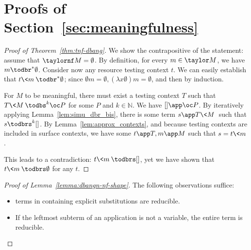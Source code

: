 \section{Proofs of Section~\ref{sec:meaningfulness}}
\label{appendix:meaningfulness}

\begin{proof}[Proof of Theorem~\ref{thm:tnf-dbang}]
	We show the contrapositive of the statement: assume that $\taylornf
	M=\emptyset$. By definition, for every $m\in\taylor M$, we have $m\todbr^*
	\emptyset$. Consider now any resource testing context $t$. We can easily
	establish that $t\<m\>\todbr^* \emptyset $; since $\emptyset m=\emptyset,
	(\lambda x \emptyset)m=\emptyset$, and then by induction.

	For $M$ to be meaningful, there must exist a testing context $T$ such that
	$T\<M\>\todbs^k \oc P$ for some $P$ and $k\in\mathbb N$. We have
	$[]\app \oc P$. By iteratively applying 
	Lemma~\ref{lem:simu_dbr_bis}, there is some term $s\app T\<M\>$ such
	that $s\todbrs^k []$. By Lemma~\ref{lem:approx_contexts}, and because
	testing contexts are included in surface contexts, we have some $t\app
	T, m\app M$ such that $s=t\<m\>$.

	This leads to a contradiction: $t\<m\>\todbrs []$, yet we have shown
	that $t\<m\>\todbrs \emptyset$ for any $t$.
\end{proof}


\begin{proof}[Proof of Lemma~\ref{lemma:dbangn-nf-shape}]
	The following observations suffice:
	\begin{itemize}
		\item terms in \dbangn{} containing explicit substitutions are
			reducible. 
		\item If the leftmost subterm of an application is not a
		variable, the entire term is reducible. \qedhere
	\end{itemize}
\end{proof}

